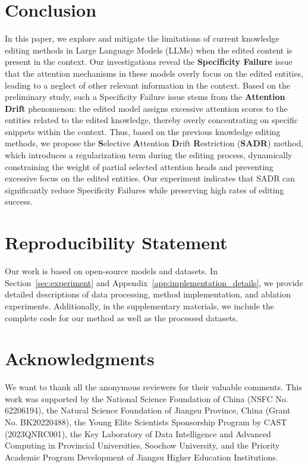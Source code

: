 \section{Conclusion}
In this paper, we explore and mitigate the limitations of current knowledge editing methods in Large Language Models (LLMs) when the edited content is present in the context. 
Our investigations reveal the \textbf{Specificity Failure} issue that the attention mechanisms in these models overly focus on the edited entities, leading to a neglect of other relevant information in the context. 
Based on the preliminary study, such a Specificity Failure issue stems from the \textbf{Attention Drift} phenomenon: the edited model assigns excessive attention scores to the entities related to the edited knowledge, thereby overly concentrating on specific snippets within the context.
Thus, based on the previous knowledge editing methods, we propose the \textbf{S}elective \textbf{A}ttention \textbf{D}rift \textbf{R}estriction (\textbf{SADR}) method, which introduces a regularization term during the editing process, dynamically constraining the weight of partial selected attention heads and preventing excessive focus on the edited entities. 
Our experiment indicates that SADR can significantly reduce Specificity Failures while preserving high rates of editing success. 

\section*{Reproducibility Statement}
Our work is based on open-source models and datasets. In Section~\ref{sec:experiment} and Appendix~\ref{app:implementation_details}, we provide detailed descriptions of data processing, method implementation, and ablation experiments. Additionally, in the supplementary materials, we include the complete code for our method as well as the processed datasets. 

\section*{Acknowledgments}
We want to thank all the anonymous reviewers for their valuable comments. 
This work was supported by the National Science Foundation of China (NSFC No. 62206194), the Natural Science Foundation of Jiangsu Province, China (Grant No. BK20220488), the Young Elite Scientists Sponsorship Program by CAST (2023QNRC001), the Key Laboratory of Data Intelligence and Advanced Computing in Provincial Universities, Soochow University, and the Priority Academic Program Development of Jiangsu Higher Education Institutions.
